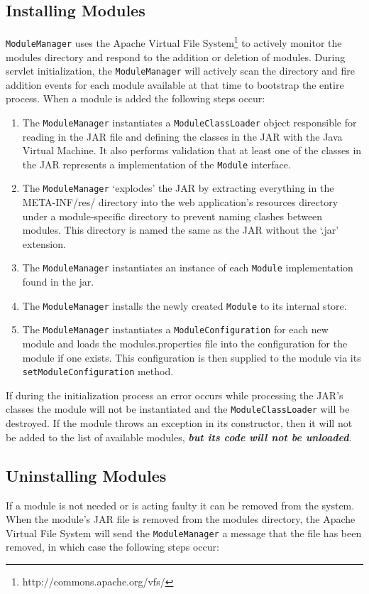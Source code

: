 \documentclass[letterpaper]{report}
\begin{document}
\subsection{Installing Modules}
\texttt{ModuleManager} uses the Apache Virtual File System\footnote{http://commons.apache.org/vfs/} to actively monitor the modules directory and respond to the addition or deletion of modules. During servlet initialization, the \texttt{ModuleManager} will actively scan the directory and fire addition events for each module available at that time to bootstrap the entire process. When a module is added the following steps occur:

\begin{enumerate}
\item The \texttt{ModuleManager} instantiates a \texttt{ModuleClassLoader} object responsible for reading in the JAR file and defining the classes in the JAR with the Java Virtual Machine. It also performs validation that at least one of the classes in the JAR represents a implementation of the \texttt{Module} interface.
\item The \texttt{ModuleManager} `explodes' the JAR by extracting everything in the META-INF/res/ directory into the web application's resources directory under a module-specific directory to prevent naming clashes between modules. This directory is named the same as the JAR without the `.jar' extension.
\item The \texttt{ModuleManager} instantiates an instance of each \texttt{Module} implementation found in the jar.
\item The \texttt{ModuleManager} installs the newly created \texttt{Module} to its internal store.
\item The \texttt{ModuleManager} instantiates a \texttt{ModuleConfiguration} for each new module and loads the modules.properties file into the configuration for the module if one exists. This configuration is then supplied to the module via its \texttt{setModuleConfiguration} method.
\end{enumerate}

If during the initialization process an error occurs while processing the JAR's classes the module will not be instantiated and the \texttt{ModuleClassLoader} will be destroyed. If the module throws an exception in its constructor, then it will not be added to the list of available modules, \textbf{\textit{but its code will not be unloaded}}.

\subsection{Uninstalling Modules}
If a module is not needed or is acting faulty it can be removed from the system. When the module's JAR file is removed from the modules directory, the Apache Virtual File System will send the \texttt{ModuleManager} a message that the file has been removed, in which case the following steps occur:
\end{document}
